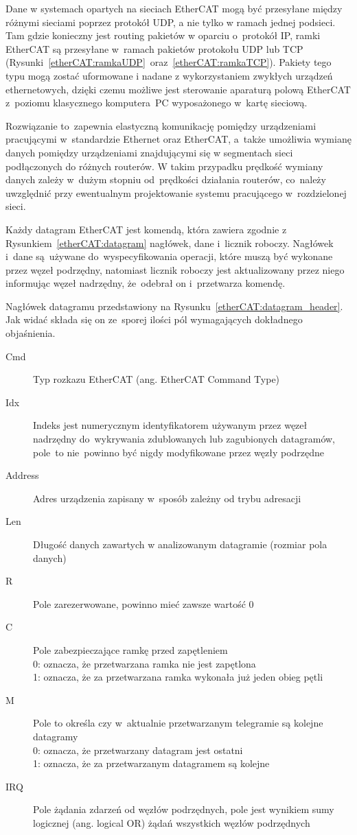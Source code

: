 Dane w systemach opartych na sieciach EtherCAT mogą być przesyłane między różnymi sieciami poprzez protokół UDP, a nie tylko w ramach jednej podsieci. Tam gdzie konieczny jest routing pakietów w oparciu o~protokół IP, ramki EtherCAT są przesyłane w~ramach pakietów protokołu UDP lub TCP (Rysunki~\ref{etherCAT:ramkaUDP}~oraz~\ref{etherCAT:ramkaTCP}). Pakiety tego typu mogą zostać uformowane i nadane z wykorzystaniem zwykłych urządzeń ethernetowych, dzięki czemu możliwe jest sterowanie aparaturą polową EtherCAT z~poziomu klasycznego komputera~PC wyposażonego w~kartę sieciową.

Rozwiązanie to~zapewnia elastyczną komunikację pomiędzy urządzeniami pracującymi w~standardzie Ethernet oraz EtherCAT, a~także umożliwia wymianę danych pomiędzy urządzeniami znajdującymi się w segmentach sieci podłączonych do różnych routerów. W takim przypadku prędkość wymiany danych zależy w~dużym stopniu od~prędkości działania routerów, co~należy uwzględnić przy ewentualnym projektowanie systemu pracującego w~rozdzielonej sieci.

Każdy datagram EtherCAT jest komendą, która zawiera zgodnie z Rysunkiem~\ref{etherCAT:datagram} nagłówek, dane i~licznik roboczy. Nagłówek i~dane są~używane do~wyspecyfikowania operacji, które muszą być wykonane przez węzeł podrzędny, natomiast licznik roboczy jest aktualizowany przez niego informując węzeł nadrzędny, że~odebrał on i~przetwarza komendę.

Nagłówek datagramu przedstawiony na Rysunku~\ref{etherCAT:datagram_header}. Jak widać składa się on ze~sporej ilości pól wymagających dokładnego objaśnienia.
\begin{description}
\item[Cmd] Typ rozkazu EtherCAT (ang. EtherCAT Command Type)
\item[Idx] Indeks jest numerycznym identyfikatorem używanym przez węzeł nadrzędny do~wykrywania zdublowanych lub zagubionych datagramów, pole~to nie~powinno być nigdy modyfikowane przez węzły podrzędne
\item[Address] Adres urządzenia zapisany w~sposób zależny od trybu adresacji
\item[Len] Długość danych zawartych w analizowanym datagramie (rozmiar pola danych)
\item[R] Pole zarezerwowane, powinno mieć zawsze wartość 0
\item[C] Pole zabezpieczające ramkę przed zapętleniem\\
0: oznacza, że przetwarzana ramka nie jest zapętlona \\
1: oznacza, że za przetwarzana ramka wykonała już jeden obieg pętli
\item[M] Pole to określa czy w~aktualnie przetwarzanym telegramie są kolejne datagramy \\
0: oznacza, że przetwarzany datagram jest ostatni \\
1: oznacza, że za przetwarzanym datagramem są kolejne
\item[IRQ] Pole żądania zdarzeń od węzłów podrzędnych, pole jest wynikiem sumy logicznej (ang. logical OR) żądań wszystkich węzłów podrzędnych
\end{description}

